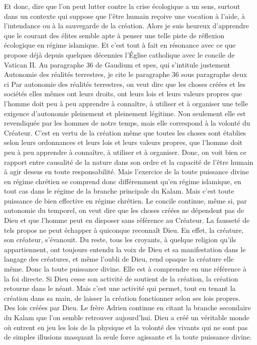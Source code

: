 Et donc, dire que l'on peut lutter contre la crise écologique a un sens, surtout dans un contexte qui suppose que l'être humain reçoive une vocation à l'aide, à l'intendance ou à la sauvegarde de la création. Alors je suis heureux d'apprendre que le courant des élites semble apte à penser une telle piste de réflexion écologique en régime islamique. Et c'est tout à fait en résonance avec ce que propose déjà depuis quelques décennies l'Église catholique avec le concile de Vatican II.
Au paragraphe 36 de Gaudium et spes, qui s'intitule justement Autonomie des réalités terrestres, je cite le paragraphe 36 sous paragraphe deux ci Par autonomie des réalités terrestres, on veut dire que les choses créées et les sociétés elles mêmes ont leurs droits, ont leurs lois et leurs valeurs propres que l'homme doit peu à peu apprendre à connaître, à utiliser et à organiser une telle exigence d'autonomie pleinement et pleinement légitime.
Non seulement elle est revendiquée par les hommes de notre temps, mais elle correspond à la volonté du Créateur. C'est en vertu de la création même que toutes les choses sont établies selon leurs ordonnances et leurs lois et leurs valeurs propres, que l'homme doit peu à peu apprendre à connaître, à utiliser et à organiser. Donc, on voit bien ce rapport entre causalité de la nature dans son ordre et la capacité de l'être humain à agir dessus en toute responsabilité.
Mais l'exercice de la toute puissance divine en régime chrétien se comprend donc différemment qu'en régime islamique, en tout cas dans le régime de la branche principale du Kalam. Mais c'est toute puissance de bien effective en régime chrétien. Le concile continue, même si, par autonomie du temporel, on veut dire que les choses créées ne dépendent pas de Dieu et que l'homme peut en disposer sans référence au Créateur.
La fausseté de tels propos ne peut échapper à quiconque reconnaît Dieu. En effet, la créature, son créateur, s'évanouit. Du reste, tous les croyants, à quelque religion qu'ils appartiennent, ont toujours entendu la voix de Dieu et sa manifestation dans le langage des créatures, et même l'oubli de Dieu, rend opaque la créature elle même. Donc la toute puissance divine. Elle est à comprendre en une référence à la foi directe.
Si Dieu cesse son activité de soutient de la création, la création retourne dans le néant. Mais c'est une activité qui permet, tout en tenant la création dans sa main, de laisser la création fonctionner selon ses lois propres. Des lois créées par Dieu. Le frère Adrien continue en citant la branche secondaire du Kalam que l'on semble retrouver aujourd'hui. Dieu a créé un véritable monde où entrent en jeu les lois de la physique et la volonté des vivants qui ne sont pas de simples illusions masquant la seule force agissante et la toute puissance divine.
 
